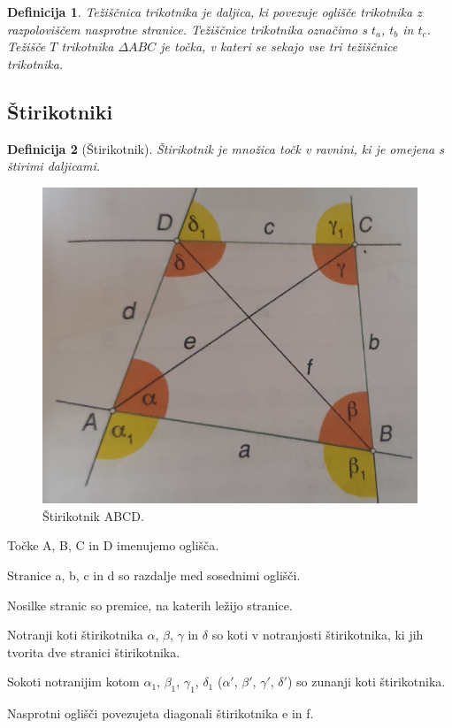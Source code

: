 \documentclass{article}
\newtheorem{definicija}{Definicija}[subsection]
\begin{document}
\begin{definicija}
    Težiščnica trikotnika je daljica, ki povezuje oglišče trikotnika z razpoloviščem nasprotne stranice. Težiščnice trikotnika označimo s $t_a$, $t_b$ in $t_c$. Težišče $T$ trikotnika $\Delta ABC$ je točka, v kateri se sekajo vse tri težiščnice trikotnika.
\end{definicija}

\pagebreak
\subsection{ Štirikotniki }

\begin{definicija}[Štirikotnik]
    Štirikotnik je množica točk v ravnini, ki je omejena s štirimi daljicami.    
\end{definicija}

\begin{figure}[h]
    \includegraphics[width=0.7\linewidth]{stirikotnik.png}
    \centering
    \caption{Štirikotnik ABCD.}
\end{figure}

Točke A, B, C in D imenujemo oglišča.

Stranice a, b, c in d so razdalje med sosednimi oglišči.

Nosilke stranic so premice, na katerih ležijo stranice.

Notranji koti štirikotnika $\alpha$, $\beta$, $\gamma$ in $\delta$ so koti v notranjosti štirikotnika, ki jih tvorita dve stranici štirikotnika.

Sokoti notranijim kotom $\alpha_1$, $\beta_1$, $\gamma_1$, $\delta_1$ ($\alpha'$, $\beta'$, $\gamma'$, $\delta'$) so zunanji koti štirikotnika.

Nasprotni oglišči povezujeta diagonali štirikotnika e in f. 
\end{document}
